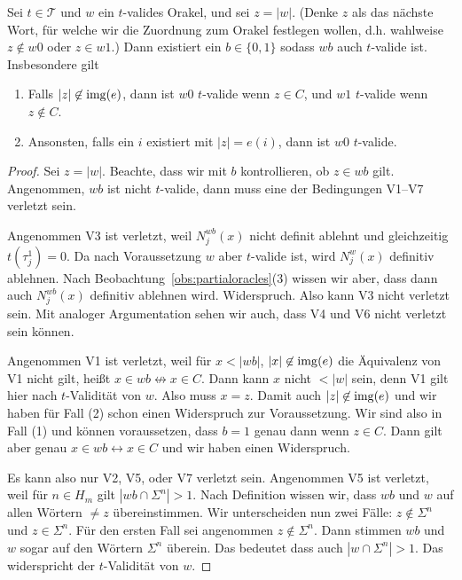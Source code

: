 \begin{lemma}\label{claim:myoracle-up-extension}
    Sei $t\in\mathcal T$ und $w$ ein $t$-valides Orakel, und sei $z=|w|$. 
    (Denke $z$ als das nächste Wort, für welche wir die Zuordnung zum Orakel festlegen wollen, d.h. wahlweise $z\not\in w0$ oder $z\in w1$.)
    Dann existiert ein $b\in\{0,1\}$ sodass $wb$ auch $t$-valide ist.
    Insbesondere gilt
    \begin{enumerate}
        \item Falls $|z|\not\in\operatorname{img}(e)$, dann ist $w0$ $t$-valide wenn $z\in C$, und $w1$ $t$-valide wenn $z\not\in C$.
        \item Ansonsten, falls ein $i$ existiert mit $|z|=e(i)$, dann ist $w0$ $t$-valide.
    \end{enumerate}
\end{lemma}
\begin{proof}
    Sei $z=|w|$. Beachte, dass wir mit $b$ kontrollieren, ob $z\in wb$ gilt.
    Angenommen, $wb$ ist nicht $t$-valide, dann muss eine der Bedingungen V1--V7 verletzt sein.

    Angenommen V3 ist verletzt, weil $N_j^{wb}(x)$ nicht definit ablehnt und gleichzeitig $t(\tau_j^1)=0$. Da nach Voraussetzung $w$ aber $t$-valide ist, wird $N_j^{w}(x)$ definitiv ablehnen.
    Nach Beobachtung~\ref{obs:partialoracles}(3) wissen wir aber, dass dann auch $N_j^{wb}(x)$ definitiv ablehnen wird. Widerspruch.
    Also kann V3 nicht verletzt sein. Mit analoger Argumentation sehen wir auch, dass V4 und V6 nicht verletzt sein können.

    Angenommen V1 ist verletzt, weil für $x<|wb|$, $|x|\not\in\operatorname{img}(e)$ die Äquivalenz von V1 nicht gilt, heißt $x\in wb \not\leftrightarrow x\in C$. Dann kann $x$ nicht $<|w|$ sein, denn V1 gilt hier nach $t$-Validität von $w$. Also muss $x=z$.
    Damit auch $|z|\not\in\operatorname{img}(e)$ und wir haben für Fall (2) schon einen Widerspruch zur Voraussetzung.
    Wir sind also in Fall (1) und können voraussetzen, dass $b=1$ genau dann wenn $z\in C$.
    Dann gilt aber genau $x\in wb\leftrightarrow x\in C$ und wir haben einen Widerspruch.

    Es kann also nur V2, V5, oder V7 verletzt sein.
    Angenommen V5 ist verletzt, weil für $n\in H_m$ gilt $|wb\cap\Sigma^n|> 1$.
    Nach Definition wissen wir, dass $wb$ und $w$ auf allen Wörtern $\neq z$ übereinstimmen.
    Wir unterscheiden nun zwei Fälle: $z\not\in\Sigma^n$ und $z\in\Sigma^n$.
    Für den ersten Fall sei angenommen $z\not\in\Sigma^n$. Dann stimmen $wb$ und $w$ sogar auf den Wörtern $\Sigma^n$ überein. Das bedeutet dass auch $|w\cap\Sigma^n|>1$.
    Das widerspricht der $t$-Validität von $w$.


\end{proof}
